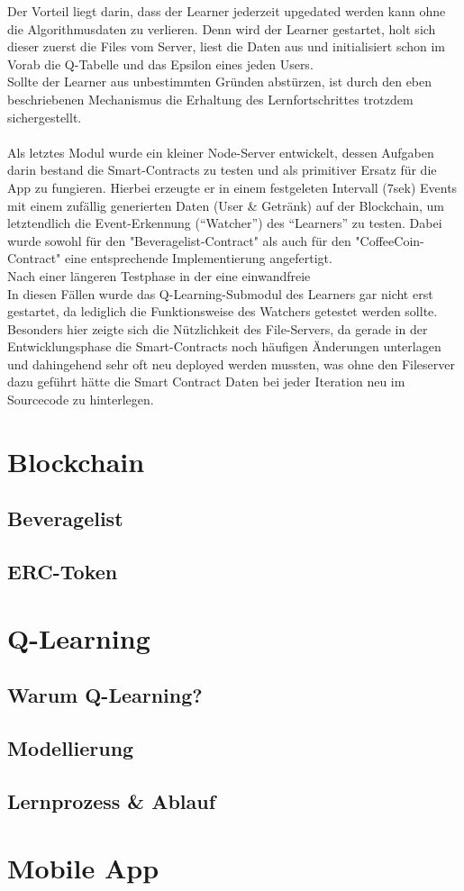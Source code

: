 Der Vorteil liegt darin, dass der Learner jederzeit upgedated werden kann ohne die Algorithmusdaten zu verlieren. Denn wird der Learner gestartet, holt sich dieser zuerst die Files vom Server, liest die Daten aus und initialisiert schon im Vorab die Q-Tabelle und das Epsilon eines jeden Users. \\
Sollte der Learner aus unbestimmten Gründen abstürzen, ist durch den eben beschriebenen Mechanismus die Erhaltung des Lernfortschrittes trotzdem sichergestellt.\\\\
Als letztes Modul wurde ein kleiner Node-Server entwickelt, dessen Aufgaben darin bestand die Smart-Contracts zu testen und als primitiver Ersatz für die App zu fungieren. Hierbei erzeugte er in einem festgeleten Intervall (7sek) Events mit einem zufällig generierten Daten (User \& Getränk) auf der Blockchain, um letztendlich die Event-Erkennung (“Watcher”) des “Learners” zu testen. Dabei wurde sowohl für den "Beveragelist-Contract" als auch für den "CoffeeCoin-Contract" eine entsprechende Implementierung angefertigt.\\
Nach einer längeren Testphase in der eine einwandfreie 
\\In diesen Fällen wurde das Q-Learning-Submodul des Learners gar nicht erst gestartet, da lediglich die Funktionsweise des Watchers getestet werden sollte. \\
Besonders hier zeigte sich die Nützlichkeit des File-Servers, da gerade in der Entwicklungsphase die Smart-Contracts noch häufigen Änderungen unterlagen und dahingehend sehr oft neu deployed werden mussten, was ohne den Fileserver dazu geführt hätte die Smart Contract Daten bei jeder Iteration neu im Sourcecode zu hinterlegen.  

\section{Blockchain}
\subsection{Beveragelist}
\subsection{ERC-Token}

\section{Q-Learning}
\subsection{Warum Q-Learning?}
\subsection{Modellierung}
\subsection{Lernprozess \& Ablauf}

\section{Mobile App}


